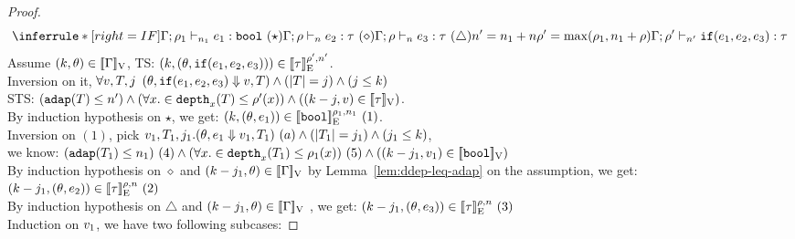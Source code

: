 \documentclass[a4paper,11pt]{article}
\theoremstyle{definition}
\begin{document}
\begin{proof}
\[
    \inferrule*[right = IF]{
      \Gamma; \dmap_1 \tvdash{\nnatA_1} \expr_1: \tbool ~ (\star) \\
      \Gamma; \dmap \tvdash{\nnatA} \expr_2: \type ~(\diamond) \\
      \Gamma; \dmap \tvdash{\nnatA} \expr_3: \type ~(\triangle) \\\\
      \nnatA' = \nnatA_1 + \nnatA \\
      \dmap' = \max(\dmap_1, \nnatA_1 + \dmap)
    }{
      \Gamma; \dmap' \tvdash{\nnatA'} \eif(\expr_1, \expr_2, \expr_3):  \type
    }
\]
Assume $(k, \theta) \in [\![ \Gamma ]\!]_{\text{V}}$, TS: $(k, (\theta, \mathtt{if}(e_1, e_2, e_3))) \in [\![ \tau ]\!]_{\text{E}}^{\rho', n'}$.\\
%
Inversion on it, $\forall v, T, j$ $(\theta, \mathtt{if}(e_1, e_2, e_3) \mathrel{\Downarrow} v, T) \land (|T| = j) \land (j \leq k)$\\
%
STS: $(\mathtt{adap}(T) \leq n') \land (\forall x. \in \mathtt{depth}_{x}(T) \leq \rho'(x)) \land ((k - j, v) \in [\![ \tau ]\!]_{\text{V}})$.\\
%
By induction hypothesis on $\star$, we get: $(k, (\theta, e_1)) \in [\![ \mathtt{bool} ]\!]_{\text{E}}^{\rho_1, n_1} ~(1)$.\\
%
Inversion on $(1)$, pick $ v_1, T_1, j_1. (\theta, e_1 \mathrel{\Downarrow} v_1, T_1) ~ (a) \land (|T_1| = j_1) \land (j_1 \leq k)$,\\
%
we know: $(\mathtt{adap}(T_1) \leq n_1)~(4) \land (\forall x. \in
\mathtt{depth}_{x}(T_1) \leq \rho_1(x)) ~(5) \land ((k - j_1, v_1) \in [\![ \mathtt{bool} ]\!]_{\text{V}})$\\
%
By induction hypothesis on $\diamond$ and $(k-j_1, \theta) \in
[\![ \Gamma ]\!]_{\text{V}}$ by Lemma~\ref{lem:ddep-leq-adap} on the assumption, we get: $(k-j_1, (\theta, e_2)) \in [\![ \tau ]\!]_{\text{E}}^{\rho, n} ~(2)$\\
%
By induction hypothesis on $\triangle$ and $(k-j_1, \theta) \in
[\![ \Gamma ]\!]_{\text{V}}$ , we get: $(k-j_1, (\theta, e_3)) \in [\![ \tau ]\!]_{\text{E}}^{\rho, n} ~(3)$\\
%
Induction on $v_1$, we have two following subcases:


\end{proof}
\end{document}

